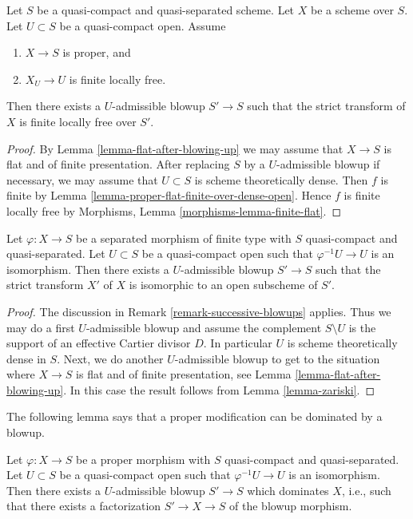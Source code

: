 \begin{lemma}
\label{lemma-finite-after-blowing-up}
Let $S$ be a quasi-compact and quasi-separated scheme.
Let $X$ be a scheme over $S$.
Let $U \subset S$ be a quasi-compact open.
Assume
\begin{enumerate}
\item $X \to S$ is proper, and
\item $X_U \to U$ is finite locally free.
\end{enumerate}
Then there exists a $U$-admissible blowup $S' \to S$ such that
the strict transform of $X$ is finite locally free over $S'$.
\end{lemma}

\begin{proof}
By Lemma \ref{lemma-flat-after-blowing-up} we may assume that
$X \to S$ is flat and of finite presentation. After replacing
$S$ by a $U$-admissible blowup if necessary, we may assume
that $U \subset S$ is scheme theoretically dense. Then $f$ is
finite by Lemma \ref{lemma-proper-flat-finite-over-dense-open}.
Hence $f$ is finite locally free by
Morphisms, Lemma \ref{morphisms-lemma-finite-flat}.
\end{proof}

\begin{lemma}
\label{lemma-zariski-after-blowup}
Let $\varphi : X \to S$ be a separated morphism of finite type with
$S$ quasi-compact and quasi-separated. Let $U \subset S$ be a
quasi-compact open such that $\varphi^{-1}U \to U$ is an isomorphism.
Then there exists a $U$-admissible blowup $S' \to S$ such that
the strict transform $X'$ of $X$ is isomorphic to an open subscheme
of $S'$.
\end{lemma}

\begin{proof}
The discussion in Remark \ref{remark-successive-blowups} applies.
Thus we may do a first $U$-admissible blowup and assume the complement
$S \setminus U$ is the support of an effective Cartier divisor $D$.
In particular $U$ is scheme theoretically dense in $S$.
Next, we do another $U$-admissible blowup to get to the situation where
$X \to S$ is flat and of finite presentation, see
Lemma \ref{lemma-flat-after-blowing-up}.
In this case the result follows from Lemma \ref{lemma-zariski}.
\end{proof}

\noindent
The following lemma says that a proper modification can be dominated
by a blowup.

\begin{lemma}
\label{lemma-dominate-modification-by-blowup}
Let $\varphi : X \to S$ be a proper morphism with
$S$ quasi-compact and quasi-separated. Let $U \subset S$ be a
quasi-compact open such that $\varphi^{-1}U \to U$ is an isomorphism.
Then there exists a $U$-admissible blowup $S' \to S$
which dominates $X$, i.e., such that there exists a factorization
$S' \to X \to S$ of the blowup morphism.
\end{lemma}

